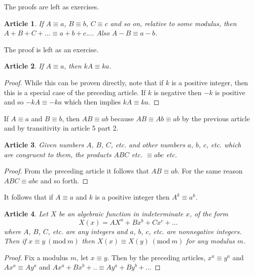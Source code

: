 \documentclass{article}
\theoremstyle{problemstyle}
\newtheorem{article}{Article}
\newcommand{\Mod}[1]{\ (\mathrm{mod}\ #1)}
\begin{document}
The proofs are left as exercises. 

\begin{article}
If $A \equiv a$, $B \equiv b$, $C \equiv c$ and so on, relative to some modulus, then $A+B+C+... \equiv a+b+c...$. Also $A-B \equiv a-b$.
\end{article}

The proof is left as an exercise. 

\begin{article}
If $A \equiv a$, then $kA \equiv ka$. 
\end{article}

\begin{proof}
While this can be proven directly, note that if $k$ is a positive integer, then this is a special case of the preceding article. If $k$ is negative then $-k$ is positive and so $-kA \equiv -ka$ which then implies $kA \equiv ka$. 
\end{proof}

If $A \equiv a$ and $B \equiv b$, then $AB \equiv ab$ because $AB \equiv Ab \equiv ab$ by the previous article and by transitivity in article 5 part 2. 

\begin{article}
Given numbers $A$, $B$, $C$, etc. and other numbers $a$, $b$, $c$, etc. which are congruent to them, the products $ABC$ etc. $\equiv abc$ etc. 
\end{article}

\begin{proof}
From the preceding article it follows that $AB \equiv ab$. For the same reason $ABC \equiv abc$ and so forth. 
\end{proof}

It follows that if $A \equiv a$ and $k$ is a positive integer then $A^k \equiv a^k$. 

\begin{article}
Let $X$ be an algebraic function in indeterminate $x$, of the form $$X(x) = AX^a+Bx^b+Cx^c+...$$ where $A$, $B$, $C$, etc. are any integers and $a$, $b$, $c$, etc. are nonnegative integers. Then if $x \equiv y \Mod{m}$ then $X(x) \equiv X(y)\Mod{m}$ for any modulus $m$. 
\end{article}

\begin{proof}
Fix a modulus $m$, let $x \equiv y$. Then by the preceding articles, $x^a \equiv y^a$ and $Ax^a \equiv Ay^a$ and $Ax^a +Bx^b +.. \equiv Ay^a+By^b+...$
\end{proof}
\end{document}
